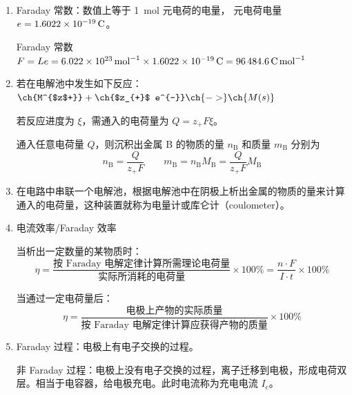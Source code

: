 \begin{enumerate}
    \item Faraday 常数：数值上等于 \qty{1}{\mole} 元电荷的电量， 元电荷电量 $e = \qty{1.6022E-19}{\coulomb}$。
    
    Faraday 常数 $F = Le = \qty{6.022E23}{\per\mole} \times \qty{1.6022E-19}{\coulomb} = \qty{96484.6}{\coulomb\per\mole}$

    \item 若在电解池中发生如下反应：
    $\ch{M^{$z$+}} + \ch{$z_{+}$ e^{-}} \ch{->} \ch{M(s)}$

    若反应进度为 $\xi$，需通入的电荷量为 $Q = z_+ F \xi$。

    通入任意电荷量 $Q$，则沉积出金属 B 的物质的量 $n_{\mathrm{B}}$ 和质量 $m_{\mathrm{B}}$ 分别为
    \begin{equation}
        n_{\mathrm{B}} = \frac{Q}{z_{+} F} \qquad m_{\mathrm{B}} = n_{\mathrm{B}} M_{\mathrm{B}} = \frac{Q}{z_{+} F}M_{\mathrm{B}}
    \end{equation}

    \item 在电路中串联一个电解池，根据电解池中在阴极上析出金属的物质的量来计算通入的电荷量，这种装置就称为电量计或库仑计（coulometer）。
    
    \item 电流效率/Faraday 效率
    
    当析出一定数量的某物质时：
    \begin{equation*}
        \eta = \frac{\text{按 Faraday 电解定律计算所需理论电荷量}}{\text{实际所消耗的电荷量}} \times 100\% = \frac{n \cdot F}{I \cdot t} \times 100\%
    \end{equation*}
    
    当通过一定电荷量后：
    \begin{equation*}
        \eta = \frac{\text{电极上产物的实际质量}}{\text{按 Faraday 电解定律计算应获得产物的质量}} \times 100\%
    \end{equation*}

    \item Faraday 过程：电极上有电子交换的过程。
    
    非 Faraday 过程：电极上没有电子交换的过程，离子迁移到电极，形成电荷双层。相当于电容器，给电极充电。此时电流称为充电电流 $I_{\mathrm{c}}$。

\end{enumerate}

